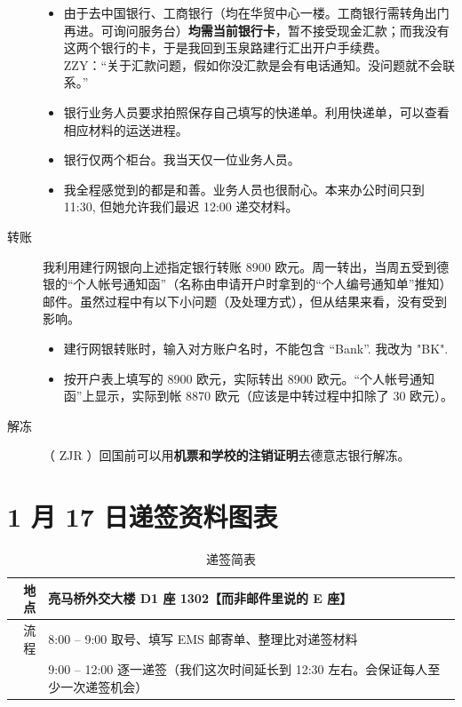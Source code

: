 \documentclass[final]{book}
\begin{document}
\begin{appendices}
\begin{description}
\begin{itemize}
\item 由于去中国银行、工商银行（均在华贸中心一楼。工商银行需转角出门再进。可询问服务台）\textbf{均需\color{blue}当前银行卡}，暂不接受现金汇款；而我没有这两个银行的卡，于是我回到玉泉路建行汇出开户手续费。%
\\
ZZY：“关于汇款问题，假如你没汇款是会有电话通知。没问题就不会联系。”
\item 银行业务人员要求拍照保存自己填写的快递单。利用快递单，可以查看相应材料的运送进程。
\item 银行仅两个柜台。我当天仅一位业务人员。
\item 我全程感觉到的都是{\color{blue}和善}。业务人员也很耐心。本来办公时间只到 11:30, 但她允许我们最迟 12:00 递交材料。
\end{itemize}
\item[转账] 我利用建行网银向上述指定银行转账 8900 欧元。周一转出，当周五受到德银的“个人帐号通知函”（名称由申请开户时拿到的“个人编号通知单”推知）邮件。虽然过程中有以下小问题（及处理方式），但从结果来看，没有受到影响。
\begin{itemize}
  \item 建行网银转账时，输入对方账户名时，不能包含 ``Bank''. 我改为 "BK".
  \item 按开户表上填写的 8900 欧元，实际转出 8900 欧元。“个人帐号通知函”上显示，实际到帐 8870 欧元（应该是中转过程中扣除了 30 欧元）。
\end{itemize} 
\item[解冻] （ ZJR ）回国前可以用\textbf{机票和学校的注销证明}去德意志银行解冻。
\end{description}

\chapter{1 月 17 日递签资料图表}\label{ap:visa-figures}
\begin{table}[htbp]
  \caption{递签简表}
  \centering
  \begin{tabular}{r|l}
    \toprule
    地点 & 亮马桥外交大楼 {\color{blue} D1 座 1302}【而非邮件里说的 E 座】 \\ \midrule
    流程 & 8:00 -- 9:00 取号、填写 EMS 邮寄单、整理比对递签材料 \\
    & 9:00 -- 12:00 逐一递签（我们这次时间延长到 12:30 左右。会保证每人至少一次递签机会） \\
    \bottomrule
  \end{tabular}
\end{table}


\end{appendices}
\end{document}
